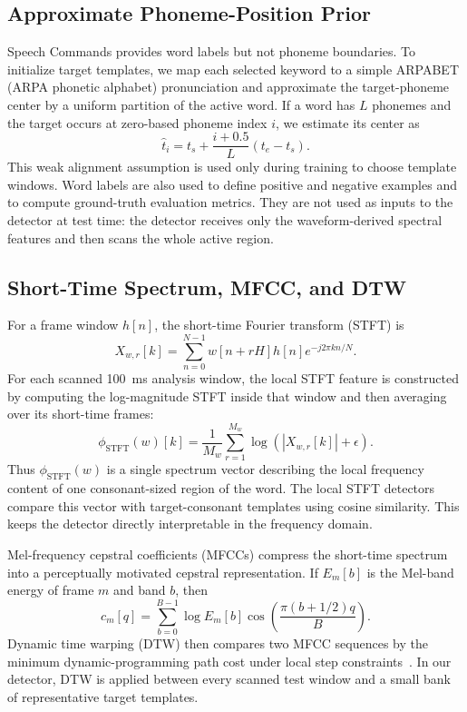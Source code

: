 \documentclass[conference]{IEEEtran}
\begin{document}
\subsection{Approximate Phoneme-Position Prior}
Speech Commands provides word labels but not phoneme boundaries. To initialize target templates, we map each selected keyword to a simple ARPABET (ARPA phonetic alphabet) pronunciation and approximate the target-phoneme center by a uniform partition of the active word. If a word has $L$ phonemes and the target occurs at zero-based phoneme index $i$, we estimate its center as
\begin{equation}
\hat{t}_i=t_s+\frac{i+0.5}{L}(t_e-t_s).
\end{equation}
This weak alignment assumption is used only during training to choose template windows. Word labels are also used to define positive and negative examples and to compute ground-truth evaluation metrics. They are not used as inputs to the detector at test time: the detector receives only the waveform-derived spectral features and then scans the whole active region.

\subsection{Short-Time Spectrum, MFCC, and DTW}
For a frame window $h[n]$, the short-time Fourier transform (STFT) is
\begin{equation}
X_{w,r}[k]=\sum_{n=0}^{N-1} w[n+rH] h[n] e^{-j2\pi kn/N}.
\end{equation}
For each scanned 100~ms analysis window, the local STFT feature is constructed by computing the log-magnitude STFT inside that window and then averaging over its short-time frames:
\begin{equation}
\phi_{\mathrm{STFT}}(w)[k]=\frac{1}{M_w}\sum_{r=1}^{M_w}\log\left(|X_{w,r}[k]|+\epsilon\right).
\end{equation}
Thus $\phi_{\mathrm{STFT}}(w)$ is a single spectrum vector describing the local frequency content of one consonant-sized region of the word. The local STFT detectors compare this vector with target-consonant templates using cosine similarity. This keeps the detector directly interpretable in the frequency domain.

Mel-frequency cepstral coefficients (MFCCs) compress the short-time spectrum into a perceptually motivated cepstral representation. If $E_m[b]$ is the Mel-band energy of frame $m$ and band $b$, then
\begin{equation}
c_m[q]=\sum_{b=0}^{B-1} \log E_m[b]\cos\!\left(\frac{\pi(b+1/2)q}{B}\right).
\end{equation}
Dynamic time warping (DTW) then compares two MFCC sequences by the minimum dynamic-programming path cost under local step constraints~\cite{sakoe1978dynamic}. In our detector, DTW is applied between every scanned test window and a small bank of representative target templates.
\end{document}
